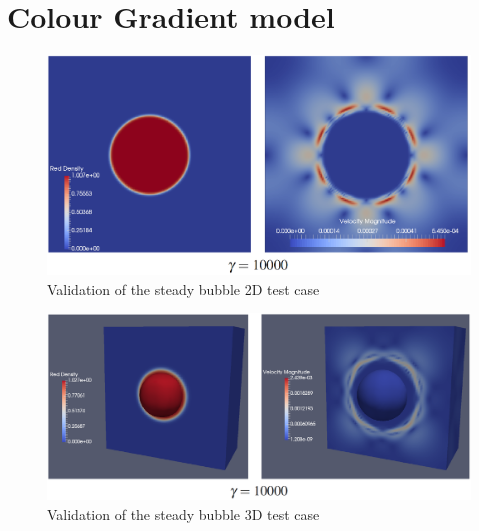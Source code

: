 \documentclass[12pt, openany]{book}
\begin{document}
\section{Colour Gradient model}

    \begin{figure}[H]
    	\centering
    	\includegraphics[width=\linewidth]{Resources/Images/AntonioValid/SteadyBubble.PNG}
    	\caption{Validation of the steady bubble 2D test case}
    	\label{fig:steadbub}
    \end{figure}
    
    \begin{figure}[H]
    	\centering
    	\includegraphics[width=\linewidth]{Resources/Images/AntonioValid/SteadyBubble3D.PNG}
    	\caption{Validation of the steady bubble 3D test case}
    	\label{fig:steadbub3d}
    \end{figure}
        
\end{document}
